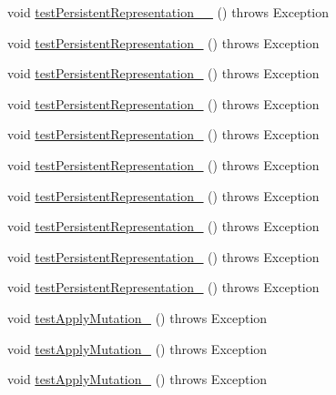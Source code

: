 \begin{DoxyCompactItemize}
\item 
void \hyperlink{classorg_1_1jgap_1_1impl_1_1_string_gene_test_a8b4e912e393e17c7c5aa86bc7df4150c}{test\-Persistent\-Representation\-\_\-\_} ()  throws Exception 
\item 
void \hyperlink{classorg_1_1jgap_1_1impl_1_1_string_gene_test_ac97ac4aeda28e2b1a8e7c098a384355a}{test\-Persistent\-Representation\-\_} ()  throws Exception 
\item 
void \hyperlink{classorg_1_1jgap_1_1impl_1_1_string_gene_test_a5a689046a25036cc811573b6983295ca}{test\-Persistent\-Representation\-\_} ()  throws Exception 
\item 
void \hyperlink{classorg_1_1jgap_1_1impl_1_1_string_gene_test_a07d1db1668b6b571bf1b96f9179a5111}{test\-Persistent\-Representation\-\_} ()  throws Exception 
\item 
void \hyperlink{classorg_1_1jgap_1_1impl_1_1_string_gene_test_aac9853ddbf68628b9256ee0d996be640}{test\-Persistent\-Representation\-\_} ()  throws Exception 
\item 
void \hyperlink{classorg_1_1jgap_1_1impl_1_1_string_gene_test_a24d0e36e510d8ef074c03f8288fd36de}{test\-Persistent\-Representation\-\_} ()  throws Exception 
\item 
void \hyperlink{classorg_1_1jgap_1_1impl_1_1_string_gene_test_a92c2b8792d6d787c2190f1162a29baed}{test\-Persistent\-Representation\-\_} ()  throws Exception 
\item 
void \hyperlink{classorg_1_1jgap_1_1impl_1_1_string_gene_test_a92e8fcfd72d3d08b208cf182ab88f426}{test\-Persistent\-Representation\-\_} ()  throws Exception 
\item 
void \hyperlink{classorg_1_1jgap_1_1impl_1_1_string_gene_test_a1de996df5c1770fee62d967eec145dce}{test\-Persistent\-Representation\-\_} ()  throws Exception 
\item 
void \hyperlink{classorg_1_1jgap_1_1impl_1_1_string_gene_test_a16887f3cf2d1c43968468c4e7ff1a9e4}{test\-Persistent\-Representation\-\_} ()  throws Exception 
\item 
void \hyperlink{classorg_1_1jgap_1_1impl_1_1_string_gene_test_a69848f33ecf01eaa01ec2ae1ca9cac17}{test\-Apply\-Mutation\-\_} ()  throws Exception 
\item 
void \hyperlink{classorg_1_1jgap_1_1impl_1_1_string_gene_test_a91167d157e7663bdf8840b3b9833a10e}{test\-Apply\-Mutation\-\_} ()  throws Exception 
\item 
void \hyperlink{classorg_1_1jgap_1_1impl_1_1_string_gene_test_abeb6880923124a6bac4ecf808cd55897}{test\-Apply\-Mutation\-\_} ()  throws Exception 

\end{DoxyCompactItemize}
